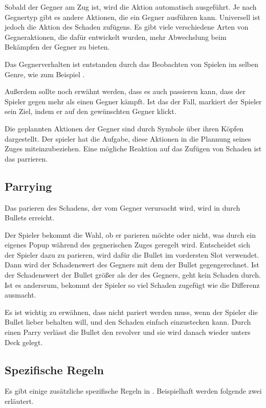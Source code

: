 Sobald der Gegner am Zug ist, wird die Aktion automatisch ausgeführt. Je nach Gegnertyp gibt es andere Aktionen,
die ein Gegner ausführen kann. Universell ist jedoch die Aktion des Schaden zufügens.
Es gibt viele verschiedene Arten von Gegneraktionen, die dafür entwickelt wurden, mehr Abwechslung beim Bekämpfen der Gegner zu bieten.

Das Gegnerverhalten ist entstanden durch das Beobachten von Spielen im selben Genre, wie zum Beispiel . 


Außerdem sollte noch erwähnt werden, dass es auch passieren kann, dass der Spieler gegen mehr als einen Gegner kämpft.
Ist das der Fall, markiert der Spieler sein Ziel, indem er auf den gewünschten Gegner klickt.



Die geplannten Aktionen der Gegner sind durch Symbole über ihren Köpfen dargestellt. Der spieler hat die Aufgabe,
diese Aktionen in die Plannung seines Zuges miteinzubeziehen. Eine mögliche Reaktion auf das Zufügen von Schaden ist das parrieren.


\subsection{Parrying}\label{parrying}
Das parieren des Schadens, der vom Gegner verursacht wird, wird in \FF durch Bullets erreicht.


Der Spieler bekommt die Wahl, ob er parieren möchte oder nicht, was durch ein eigenes Popup während des gegnerischen Zuges geregelt wird.
Entscheidet sich der Spieler dazu zu parieren, wird dafür die Bullet im vordersten Slot verwendet.
Dann wird der Schadenswert des Gegners mit dem der Bullet gegengerechnet. Ist der Schadenswert der Bullet größer als der des Gegners,
geht kein Schaden durch. Ist es andersrum, bekommt der Spieler so viel Schaden zugefügt wie die Differenz ausmacht.


Es ist wichtig zu erwähnen, dass nicht pariert werden muss, wenn der Spieler die Bullet lieber behalten will, und den Schaden einfach einzustecken kann.
Durch einen Parry verlässt die Bullet den revolver und sie wird danach wieder unters Deck gelegt.


\subsection{Spezifische Regeln}\label{spezifische_regeln}

Es gibt einige zusätzliche spezifische Regeln in \FF. Beispielhaft werden folgende zwei erläutert.

